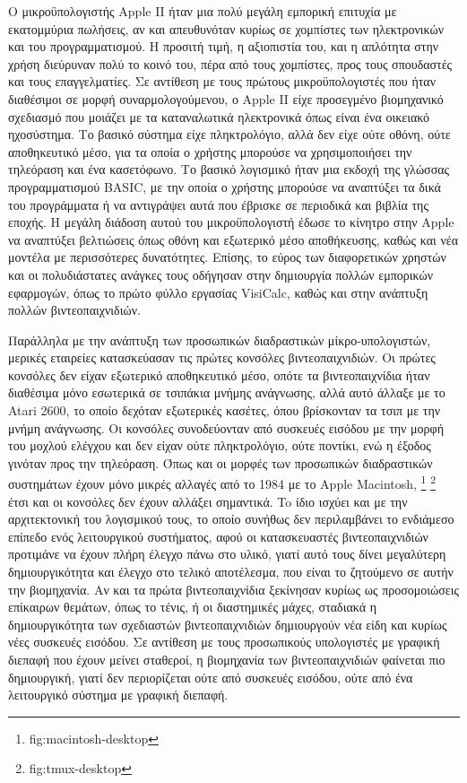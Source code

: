 \documentclass[
]{article}
\begin{document}
Ο μικροϋπολογιστής Apple II ήταν μια πολύ μεγάλη εμπορική επιτυχία με
εκατομμύρια πωλήσεις, αν και απευθυνόταν κυρίως σε χομπίστες των
ηλεκτρονικών και του προγραμματισμού. Η προσιτή τιμή, η αξιοπιστία του,
και η απλότητα στην χρήση διεύρυναν πολύ το κοινό του, πέρα από τους
χομπίστες, προς τους σπουδαστές και τους επαγγελματίες. Σε αντίθεση με
τους πρώτους μικροϋπολογιστές που ήταν διαθέσιμοι σε μορφή
συναρμολογούμενου, ο Apple II είχε προσεγμένο βιομηχανικό σχεδιασμό που
μοιάζει με τα καταναλωτικά ηλεκτρονικά όπως είναι ένα οικειακό
ηχοσύστημα. Το βασικό σύστημα είχε πληκτρολόγιο, αλλά δεν είχε ούτε
οθόνη, ούτε αποθηκευτικό μέσο, για τα οποία ο χρήστης μπορούσε να
χρησιμοποιήσει την τηλεόραση και ένα κασετόφωνο. Το βασικό λογισμικό
ήταν μια εκδοχή της γλώσσας προγραμματισμού BASIC, με την οποία ο
χρήστης μπορούσε να αναπτύξει τα δικά του προγράμματα ή να αντιγράψει
αυτά που έβρισκε σε περιοδικά και βιβλία της εποχής. Η μεγάλη διάδοση
αυτού του μικροϋπολογιστή έδωσε το κίνητρο στην Apple να αναπτύξει
βελτιώσεις όπως οθόνη και εξωτερικό μέσο αποθήκευσης, καθώς και νέα
μοντέλα με περισσότερες δυνατότητες. Επίσης, το εύρος των διαφορετικών
χρηστών και οι πολυδιάστατες ανάγκες τους οδήγησαν στην δημιουργία
πολλών εμπορικών εφαρμογών, όπως το πρώτο φύλλο εργασίας VisiCalc, καθώς
και στην ανάπτυξη πολλών βιντεοπαιχνιδιών.

Παράλληλα με την ανάπτυξη των προσωπικών διαδραστικών μίκρο-υπολογιστών,
μερικές εταιρείες κατασκεύασαν τις πρώτες κονσόλες βιντεοπαιχνιδιών. Οι
πρώτες κονσόλες δεν είχαν εξωτερικό αποθηκευτικό μέσο, οπότε τα
βιντεοπαιχνίδια ήταν διαθέσιμα μόνο εσωτερικά σε τσιπάκια μνήμης
ανάγνωσης, αλλά αυτό άλλαξε με το Atari 2600, το οποίο δεχόταν
εξωτερικές κασέτες, όπου βρίσκονταν τα τσιπ με την μνήμη ανάγνωσης. Οι
κονσόλες συνοδεύονταν από συσκευές εισόδου με την μορφή του μοχλού
ελέγχου και δεν είχαν ούτε πληκτρολόγιο, ούτε ποντίκι, ενώ η έξοδος
γινόταν προς την τηλεόραση. Όπως και οι μορφές των προσωπικών
διαδραστικών συστημάτων έχουν μόνο μικρές αλλαγές από το 1984 με το
Apple Macintosh, \footnote{fig:macintosh-desktop} \footnote{fig:tmux-desktop}
έτσι και οι κονσόλες δεν έχουν αλλάξει σημαντικά. To ίδιο ισχύει και με
την αρχιτεκτονική του λογισμικού τους, το οποίο συνήθως δεν περιλαμβάνει
το ενδιάμεσο επίπεδο ενός λειτουργικού συστήματος, αφού οι κατασκευαστές
βιντεοπαιχνιδιών προτιμάνε να έχουν πλήρη έλεγχο πάνω στο υλικό, γιατί
αυτό τους δίνει μεγαλύτερη δημιουργικότητα και έλεγχο στο τελικό
αποτέλεσμα, που είναι το ζητούμενο σε αυτήν την βιομηχανία. Αν και τα
πρώτα βιντεοπαιχνίδια ξεκίνησαν κυρίως ως προσομοιώσεις επίκαιρων
θεμάτων, όπως το τένις, ή οι διαστημικές μάχες, σταδιακά η
δημιουργικότητα των σχεδιαστών βιντεοπαιχνιδιών δημιουργούν νέα είδη και
κυρίως νέες συσκευές εισόδου. Σε αντίθεση με τους προσωπικούς
υπολογιστές με γραφική διεπαφή που έχουν μείνει σταθεροί, η βιομηχανία
των βιντεοπαιχνιδιών φαίνεται πιο δημιουργική, γιατί δεν περιορίζεται
ούτε από συσκευές εισόδου, ούτε από ένα λειτουργικό σύστημα με γραφική
διεπαφή.
\end{document}
